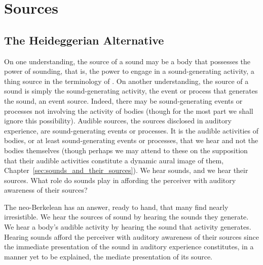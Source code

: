 \chapter{Sources} %
\label{cha:sources_of_sound}

\section{The Heideggerian Alternative} %
\label{sec:the_heideggerian_alternative}

On one understanding, the source of a sound may be a body that possesses the power of sounding, that is, the power to engage in a sound-generating activity, a thing source in the terminology of \citet{Casati:2013ca}. On another understanding, the source of a sound is simply the sound-generating activity, the event or process that generates the sound, an event source. Indeed, there may be sound-generating events or processes not involving the activity of bodies (though for the most part we shall ignore this possibility). Audible sources, the sources disclosed in auditory experience, are sound-generating events or processes. It is the audible activities of bodies, or at least sound-generating events or processes, that we hear and not the bodies themselves (though perhaps we may attend to these on the supposition that their audible activities constitute a dynamic aural image of them, Chapter~\ref{sec:sounds_and_their_sources}). We hear sounds, and we hear their sources. What role do sounds play in affording the perceiver with auditory awareness of their sources?

The neo-Berkelean has an answer, ready to hand, that many find nearly irresistible. We hear the sources of sound by hearing the sounds they generate. We hear a body's audible activity by hearing the sound that activity generates. Hearing sounds afford the perceiver with auditory awareness of their sources since the immediate presentation of the sound in auditory experience constitutes, in a manner yet to be explained, the mediate presentation of its source.

